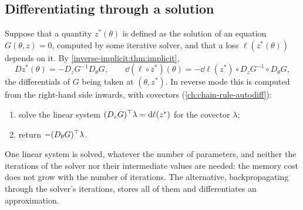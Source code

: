 \begin{notechapter}
\section{Differentiating through a solution}
\label{inverse-implicit:sec:ml}

\begin{mlthread}
Suppose that a quantity $z^*(\theta)$ is defined as the solution of an
equation $G(\theta, z) = 0$, computed by some iterative solver, and that a
loss $\ell(z^*(\theta))$ depends on it. By
\cref{inverse-implicit:thm:implicit},
\[
  Dz^*(\theta) = -D_zG^{-1}D_\theta G ,
  \qquad
  \dd(\ell\circ z^*)(\theta)
  = -\dd\ell(z^*)\circ D_zG^{-1}\circ D_\theta G ,
\]
the differentials of $G$ being taken at $(\theta, z^*)$. In reverse mode
this is computed from the right-hand side inwards, with covectors
(\cref{ch:chain-rule-autodiff}):
\begin{enumerate}[nosep]
  \item solve the linear system $(D_zG)^{\top}\lambda = \mathrm{d}\ell(z^*)$ for
        the covector $\lambda$;
  \item return $-(D_\theta G)^{\top}\lambda$.
\end{enumerate}
One linear system is solved, whatever the number of parameters, and
neither the iterations of the solver nor their intermediate values are
needed: the memory cost does not grow with the number of iterations. The
alternative, backpropagating through the solver's iterations, stores all
of them and differentiates an approximation.
\end{mlthread}


\end{notechapter}
